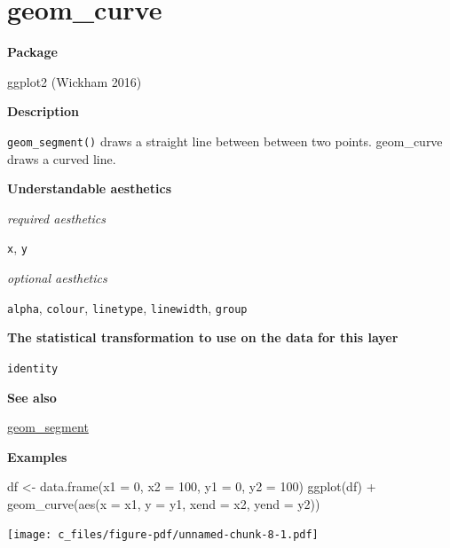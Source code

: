 \documentclass[
  letterpaper,
  DIV=11,
  numbers=noendperiod]{scrreprt}
\newenvironment{Shaded}{\begin{snugshade}}{\end{snugshade}}
\newcommand{\AttributeTok}[1]{\textcolor[rgb]{0.40,0.45,0.13}{#1}}
\newcommand{\DecValTok}[1]{\textcolor[rgb]{0.68,0.00,0.00}{#1}}
\newcommand{\FunctionTok}[1]{\textcolor[rgb]{0.28,0.35,0.67}{#1}}
\newcommand{\NormalTok}[1]{\textcolor[rgb]{0.00,0.23,0.31}{#1}}
\newcommand{\OtherTok}[1]{\textcolor[rgb]{0.00,0.23,0.31}{#1}}
\newcommand{\SpecialCharTok}[1]{\textcolor[rgb]{0.37,0.37,0.37}{#1}}
\begin{document}
\section{geom\_curve}\label{curve}

\textbf{Package}

ggplot2 (Wickham 2016)

\textbf{Description}

\texttt{geom\_segment()} draws a straight line between between two
points. geom\_curve draws a curved line.

\textbf{Understandable aesthetics}

\emph{required aesthetics}

\texttt{x}, \texttt{y}

\emph{optional aesthetics}

\texttt{alpha}, \texttt{colour}, \texttt{linetype}, \texttt{linewidth},
\texttt{group}

\textbf{The statistical transformation to use on the data for this
layer}

\texttt{identity}

\textbf{See also}

\hyperref[segment]{geom\_segment}

\textbf{Examples}

\begin{Shaded}
\begin{Highlighting}[]
\NormalTok{df }\OtherTok{\textless{}{-}} \FunctionTok{data.frame}\NormalTok{(}\AttributeTok{x1 =} \DecValTok{0}\NormalTok{, }\AttributeTok{x2 =} \DecValTok{100}\NormalTok{, }\AttributeTok{y1 =} \DecValTok{0}\NormalTok{, }\AttributeTok{y2 =} \DecValTok{100}\NormalTok{)}
\FunctionTok{ggplot}\NormalTok{(df) }\SpecialCharTok{+} 
  \FunctionTok{geom\_curve}\NormalTok{(}\FunctionTok{aes}\NormalTok{(}\AttributeTok{x =}\NormalTok{ x1, }\AttributeTok{y =}\NormalTok{ y1, }\AttributeTok{xend =}\NormalTok{ x2, }\AttributeTok{yend =}\NormalTok{ y2))}
\end{Highlighting}
\end{Shaded}

\texttt{[image: c\_files/figure-pdf/unnamed-chunk-8-1.pdf]}
\end{document}
